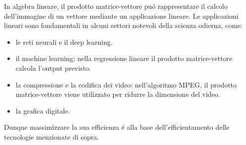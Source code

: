 In algebra lineare, il prodotto matrice-vettore puó rappresentare il calcolo dell'immagine di un vettore mediante un applicazione lineare.
Le applicazioni lineari sono fondamentali in alcuni settori notevoli della scienza odierna, come:
\begin{itemize}
    \item le reti neurali e il deep learning.
    \item il machine learning: nella regressione lineare il prodotto matrice-vettore calcola l'output previsto.
    \item la compressione e la codifica dei video: nell'algoritmo MPEG, il prodotto matrice-vettore viene utilizzato per ridurre la dimensione del video.
    \item la grafica digitale.
\end{itemize}
Dunque massimizzare la sua efficienza é alla base dell'efficientamento delle tecnologie menzionate di sopra.